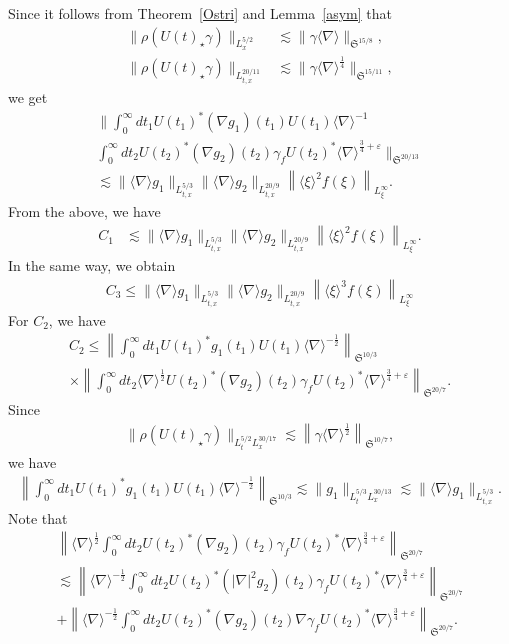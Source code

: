 \documentclass[AHL,Unicode,longabstracts,MathTools,published]{cedram}
\newcommand{\FS}{\mathfrak{S}}
\newcommand{\ga}{\gamma}
\newcommand{\ep}{\varepsilon}
\newcommand{\rh}{\rho}
\renewcommand{\No}[1]{\left\| #1 \right\|}
\newcommand{\I}{\infty}
\newcommand{\sd}{\langle \nabla \rangle}
\newcommand{\sdi}{\sd^{-1}}
\newcommand{\lxr}{\langle \xi \rangle}
\newcommand{\tx}{{t,x}}
\newcommand{\st}{\star}
\newcommand{\ft}{{\frac{1}{4}}}
\newcommand{\fh}{\frac{3}{4}}
\newcommand{\tw}{\frac{1}{2}}
\newcommand{\na}{\nabla}
\newcommand{\ls}{\lesssim}
\begin{document}
Since it follows from Theorem~\ref{Ostri} and Lemma~\ref{asym} that
\begin{align}
\|\rh(U(t)_\st \ga)\|_{L^{5/2}_x} &\ls \|\ga \sd \|_{\FS^{15/8}}, \\
\|\rh(U(t)_\st \ga)\|_{L^{20/11}_\tx} &\ls \|\ga \sd^\ft\|_{\FS^{15/11}},
\end{align}
we get
\begin{multline}
\bigg\|\int_0^\I dt_1 U(t_1)^* (\na g_1)(t_1) U(t_1) \sdi \\
\int_0^\I dt_2 U(t_2)^* (\na g_2)(t_2)\ga_f U(t_2)^* \sd^{\fh+\ep} \bigg\|_{\FS^{20/13}} \\
\ls \|\sd g_1\|_{L^{5/3}_\tx} \|\sd g_2\|_{L^{20/9}_\tx}\left\|\lxr^2 f(\xi)\right\|_{L^\I_\xi}.
\end{multline}
From the above, we have
\begin{align}
C_1 &\ls \|\sd g_1\|_{L^{5/3}_\tx} \|\sd g_2\|_{L^{20/9}_\tx} \left\|\lxr^{2}f(\xi)\right\|_{L^\I_\xi}.
\end{align}
In the same way, we obtain
\begin{align}
C_3 \le \|\sd g_1\|_{L^{5/3}_\tx} \|\sd g_2\|_{L^{20/9}_\tx} \left\|\lxr^{3}f(\xi)\right\|_{L^\I_\xi}
\end{align}
For $C_2$, we have
\begin{multline}
C_2 \le
\No{
\int_0^\I dt_1 U(t_1)^* g_1(t_1) U(t_1) \sd^{-\tw} }_{\FS^{10/3}} \\
\times \No{\int_0^\I dt_2 \sd^{\tw} U(t_2)^* (\na g_2)(t_2)\ga_f U(t_2)^* \sd^{\fh+\ep} }_{\FS^{20/7}}.
\end{multline}
Since
\begin{align}
\|\rh(U(t)_\st \ga)\|_{L^{5/2}_t L^{30/17}_x} \ls \left\|\ga \sd^\tw\right\|_{\FS^{10/7}},
\end{align}
we have
\begin{align}
\No{
\int_0^\I dt_1 U(t_1)^* g_1(t_1) U(t_1) \sd^{-\tw} }_{\FS^{10/3}}
\ls \|g_1\|_{L^{5/3}_t L^{30/13}_x} \ls \|\sd g_1\|_{L^{5/3}_\tx}.
\end{align}
Note that
\begin{multline}
\No{\sd^\tw \int_0^\I dt_2 U(t_2)^* (\na g_2)(t_2)\ga_f U(t_2)^* \sd^{\fh+\ep} }_{\FS^{20/7}} \\
\ls \No{\sd^{-\tw} \int_0^\I dt_2 U(t_2)^* (|\na|^2 g_2)(t_2)\ga_f U(t_2)^* \sd^{\fh+\ep} }_{\FS^{20/7}} \\
 + \No{\sd^{-\tw} \int_0^\I dt_2 U(t_2)^* (\na g_2)(t_2)\na \ga_f U(t_2)^* \sd^{\fh+\ep} }_{\FS^{20/7}}.
\end{multline}
\end{document}
